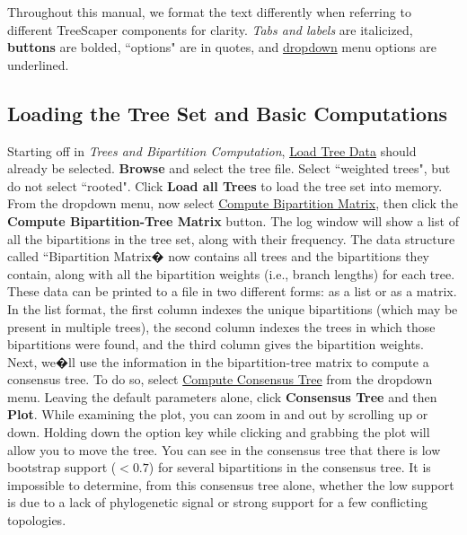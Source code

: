 \documentclass[11pt]{article}
\begin{document}
Throughout this manual, we format the text differently when referring to different TreeScaper components for clarity. {\it Tabs and labels} are italicized, {\bf buttons} are bolded, ``options" are in quotes, and \ul{dropdown} menu options are underlined. \\


\subsection{Loading the Tree Set and Basic Computations}\label{subsubsect:LoadTreesBasicComp}

Starting off in {\it Trees and Bipartition Computation}, \ul{Load Tree Data} should already be selected. {\bf Browse} and select the tree file. Select ``weighted trees", but do not select ``rooted".  Click {\bf Load all Trees} to load the tree set into memory. \\


From the dropdown menu, now select \ul{Compute Bipartition Matrix}, then click the {\bf Compute Bipartition-Tree Matrix} button.  The log window will show a list of all the bipartitions in the tree set, along with their frequency. The data structure called ``Bipartition Matrix� now contains all trees and the bipartitions they contain, along with all the bipartition weights (i.e., branch lengths) for each tree. These data can be printed to a file in two different forms: as a list or as a matrix. In the list format, the first column indexes the unique bipartitions (which may be present in multiple trees), the second column indexes the trees in which those bipartitions were found, and the third column gives the bipartition weights. \\


Next, we�ll use the information in the bipartition-tree matrix to compute a consensus tree. To do so, select \ul{Compute Consensus Tree} from the dropdown menu. Leaving the default parameters alone, click {\bf Consensus Tree} and then {\bf Plot}. While examining the plot, you can zoom in and out by scrolling up or down. Holding down the option key while clicking and grabbing the plot will allow you to move the tree. You can see in the consensus tree that there is low bootstrap support ($< 0.7$) for several bipartitions in the consensus tree.   It is impossible to determine, from this consensus tree alone, whether the low support is due to a lack of phylogenetic signal or strong support for a few conflicting topologies. \\
\end{document}
